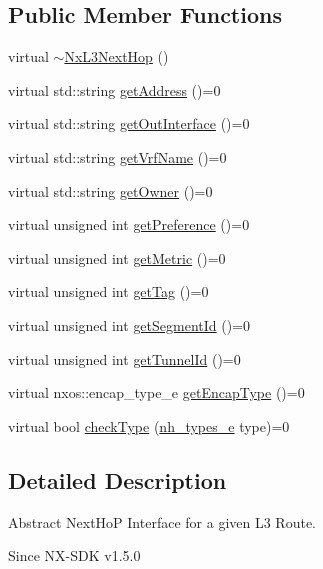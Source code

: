 \subsection*{Public Member Functions}
\begin{DoxyCompactItemize}
\item 
virtual \hyperlink{classnxos_1_1NxL3NextHop_a98362517a1a558bc9ecf457452273afb}{$\sim$NxL3NextHop} ()
\item 
virtual std::string \hyperlink{classnxos_1_1NxL3NextHop_a3a14a096cdf818a156c1be62623e644c}{getAddress} ()=0
\item 
virtual std::string \hyperlink{classnxos_1_1NxL3NextHop_a768953432b23d2d35cb6d5ff1b47cfa2}{getOutInterface} ()=0
\item 
virtual std::string \hyperlink{classnxos_1_1NxL3NextHop_ab4488d93cc0df12157430dd86f5f4242}{getVrfName} ()=0
\item 
virtual std::string \hyperlink{classnxos_1_1NxL3NextHop_a03ae40373ad9be88b6a18e7119aff080}{getOwner} ()=0
\item 
virtual unsigned int \hyperlink{classnxos_1_1NxL3NextHop_a88cebcbe727acec85e772c34b9138b18}{getPreference} ()=0
\item 
virtual unsigned int \hyperlink{classnxos_1_1NxL3NextHop_a3d72a5a7b99b292b11248b25daef63c0}{getMetric} ()=0
\item 
virtual unsigned int \hyperlink{classnxos_1_1NxL3NextHop_ab1f31be8dc748644f6ee2e4d6cbfda6c}{getTag} ()=0
\item 
virtual unsigned int \hyperlink{classnxos_1_1NxL3NextHop_a21b283ed84a9519fab6fef635e6f21d9}{getSegmentId} ()=0
\item 
virtual unsigned int \hyperlink{classnxos_1_1NxL3NextHop_aaaf9a3c718cf01e57c36d95a4fd19980}{getTunnelId} ()=0
\item 
virtual nxos::encap\_\-type\_\-e \hyperlink{classnxos_1_1NxL3NextHop_ab873695bc97ea1085013056e4989a297}{getEncapType} ()=0
\item 
virtual bool \hyperlink{classnxos_1_1NxL3NextHop_a8a061c4cbcd814b197ea778514a20cb8}{checkType} (\hyperlink{classnxos_1_1NxL3NextHop_ab58475e35a53b76cb9bdbfde04d537f3}{nh\_\-types\_\-e} type)=0
\end{DoxyCompactItemize}


\subsection{Detailed Description}
Abstract NextHoP Interface for a given L3 Route. \begin{DoxySince}{Since}
NX-\/SDK v1.5.0 
\end{DoxySince}


